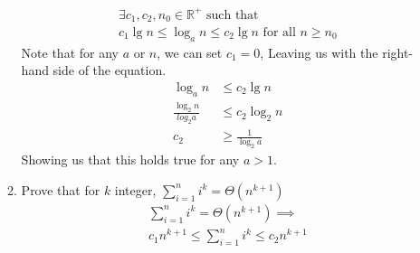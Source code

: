 \documentclass{article}
\begin{document}
\begin{enumerate}
\begin{enumerate}[label=\arabic*.]
\begin{align*}
                        \exists c_1, c_2, n_0 \in \mathbb{R}^+ \text{ such that } \\
                        c_1\lg n \leq \log_an \leq c_2\lg n \text{ for all } n \geq n_0
                    \end{align*}
                    Note that for any \(a\) or \(n\), we can set \(c_1 = 0\), Leaving us with the right-hand side of the equation.
                    \begin{align*}
                        \log_an                & \leq c_2 \lg n         \\
                        \frac{\log_2n}{log_2a} & \leq c_2 \log_2n       \\
                        c_2                    & \geq \frac{1}{\log_2a}
                    \end{align*}
                    Showing us that this holds true for any \(a > 1\).
              \item Prove that for \(k\) integer, \(\sum_{i=1}^{n}{i^k} = \Theta(n^{k+1})\) \\
                    \begin{align*}
                        \sum_{i=1}^{n}{i^k} = \Theta(n^{k+1}) \implies \\
                        c_1n^{k+1} \leq \sum_{i=1}^{n}{i^k} \leq c_2n^{k+1}
                    \end{align*}
          \end{enumerate}
\end{enumerate}
\end{document}
